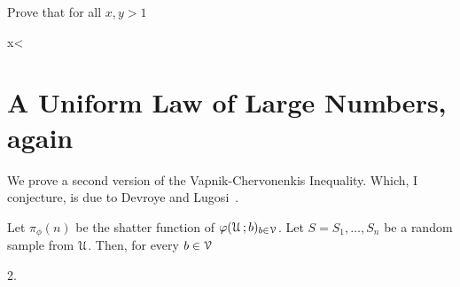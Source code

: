 \documentclass[scombinatorics.tex]{subfiles}
\begin{document}
\begin{exercise}
  Prove that for all $x,y>1$

  {\IMP}
  {x< }\QED
  
\end{exercise}







\section{A Uniform Law of Large Numbers, again}\label{uniform2}

We prove a second version of the Vapnik-Chervonenkis Inequality.
Which, I conjecture, is due to Devroye and Lugosi~\cite{DL}.
 
\begin{void_thm}\label{DL_inequality}
  Let $\pi_\phi(n)$ be the shatter function of $\varphi(\EuScript U\,;b)_{b\in\EuScript V}$.
  Let $S=S_1,\dots,S_n$ be a random sample from $\EuScript U$.
  Then, for every $b\in\EuScript V$

  {\le}
  {2}.\QED
\end{void_thm}
\end{document}
